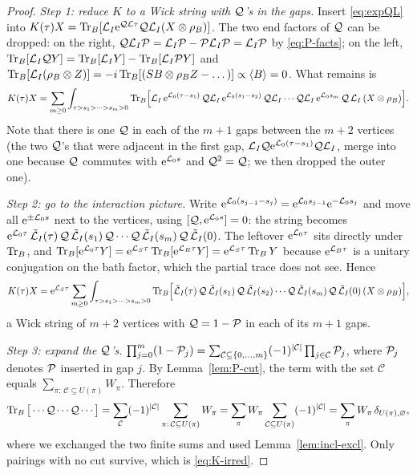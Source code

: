 \begin{proof}
\emph{Step 1: reduce $K$ to a Wick string with $\mathcal{Q}$'s in the gaps.}
Insert \cref{eq:expQL} into $K(\tau)X=\operatorname{Tr}_B[\mathcal{L}_I\mathrm{e}^{\mathcal{Q}\mathcal{L}\tau}\mathcal{Q}\mathcal{L}_I(X\otimes\rho_{B})]$.
The two end factors of $\mathcal{Q}$ can be dropped: on the right, $\mathcal{Q}\mathcal{L}_I\mathcal{P}=\mathcal{L}_I\mathcal{P}-\mathcal{P}\mathcal{L}_I\mathcal{P}=\mathcal{L}_I\mathcal{P}$ by \cref{eq:P-facts}; on the left, $\operatorname{Tr}_B[\mathcal{L}_I\mathcal{Q} Y]=\operatorname{Tr}_B[\mathcal{L}_IY]-\operatorname{Tr}_B[\mathcal{L}_I\mathcal{P} Y]$ and $\operatorname{Tr}_B[\mathcal{L}_I(\rho_{B}\otimes Z)]=-i\operatorname{Tr}_B[(SB\otimes\rho_{B} Z-\dots)]\propto\langle B\rangle=0$.
What remains is
\begin{equation}
  K(\tau)X=\sum_{m\ge0}\int_{\tau>s_1>\dots>s_m>0}\operatorname{Tr}_B\!\Big[\mathcal{L}_I\,\mathrm{e}^{\mathcal{L}_0(\tau-s_1)}\,\mathcal{Q}\mathcal{L}_I\,\mathrm{e}^{\mathcal{L}_0(s_1-s_2)}\,\mathcal{Q}\mathcal{L}_I\cdots\mathcal{Q}\mathcal{L}_I\,\mathrm{e}^{\mathcal{L}_0s_m}\,\mathcal{Q}\,\mathcal{L}_I\,(X\otimes\rho_{B})\Big].
\end{equation}
Note that there is one $\mathcal{Q}$ in each of the $m+1$ gaps between the $m+2$ vertices (the two $\mathcal{Q}$'s that were adjacent in the first gap, $\mathcal{L}_I\mathcal{Q}\mathrm{e}^{\mathcal{L}_0(\tau-s_1)}\mathcal{Q}\mathcal{L}_I$, merge into one because $\mathcal{Q}$ commutes with $\mathrm{e}^{\mathcal{L}_0 s}$ and $\mathcal{Q}^2=\mathcal{Q}$; we then dropped the outer one).

\emph{Step 2: go to the interaction picture.}
Write $\mathrm{e}^{\mathcal{L}_0(s_{j-1}-s_j)}=\mathrm{e}^{\mathcal{L}_0s_{j-1}}\mathrm{e}^{-\mathcal{L}_0s_j}$ and move all $\mathrm{e}^{\pm\mathcal{L}_0s}$ next to the vertices, using $[\mathcal{Q},\mathrm{e}^{\mathcal{L}_0s}]=0$: the string becomes $\mathrm{e}^{\mathcal{L}_0\tau}\,\tilde{\mathcal{L}}_I(\tau)\,\mathcal{Q}\,\tilde{\mathcal{L}}_I(s_1)\,\mathcal{Q}\cdots\mathcal{Q}\,\tilde{\mathcal{L}}_I(s_m)\,\mathcal{Q}\,\tilde{\mathcal{L}}_I(0)$.
The leftover $\mathrm{e}^{\mathcal{L}_0\tau}$ sits directly under $\operatorname{Tr}_B$, and $\operatorname{Tr}_B[\mathrm{e}^{\mathcal{L}_0\tau}Y]=\mathrm{e}^{\mathcal{L}_S\tau}\operatorname{Tr}_B[\mathrm{e}^{\mathcal{L}_B\tau}Y]=\mathrm{e}^{\mathcal{L}_S\tau}\operatorname{Tr}_BY$ because $\mathrm{e}^{\mathcal{L}_B\tau}$ is a unitary conjugation on the bath factor, which the partial trace does not see.
Hence
\begin{equation}
  K(\tau)X=\mathrm{e}^{\mathcal{L}_S\tau}\sum_{m\ge0}\int_{\tau>s_1>\dots>s_m>0}
  \operatorname{Tr}_B\!\Big[\tilde{\mathcal{L}}_I(\tau)\,\mathcal{Q}\,\tilde{\mathcal{L}}_I(s_1)\,\mathcal{Q}\,\tilde{\mathcal{L}}_I(s_2)\cdots\mathcal{Q}\,\tilde{\mathcal{L}}_I(s_m)\,\mathcal{Q}\,\tilde{\mathcal{L}}_I(0)\,(X\otimes\rho_{B})\Big],
  \label{eq:K-Qstring}
\end{equation}
a Wick string of $m+2$ vertices with $\mathcal{Q}=1-\mathcal{P}$ in each of its $m+1$ gaps.

\emph{Step 3: expand the $\mathcal{Q}$'s.}
$\prod_{j=0}^{m}(1-\mathcal{P}_j)=\sum_{\mathcal C\subseteq\{0,\dots,m\}}(-1)^{|\mathcal C|}\prod_{j\in\mathcal C}\mathcal{P}_j$, where $\mathcal{P}_j$ denotes $\mathcal{P}$ inserted in gap $j$.
By Lemma~\ref{lem:P-cut}, the term with the set $\mathcal C$ equals $\sum_{\pi:\,\mathcal C\subseteq U(\pi)}W_\pi$.
Therefore
\begin{equation}
  \operatorname{Tr}_B\big[\cdots\mathcal{Q}\cdots\mathcal{Q}\cdots\big]
  =\sum_{\mathcal C}(-1)^{|\mathcal C|}\sum_{\pi:\,\mathcal C\subseteq U(\pi)}W_\pi
  =\sum_{\pi}W_\pi\sum_{\mathcal C\subseteq U(\pi)}(-1)^{|\mathcal C|}
  =\sum_{\pi}W_\pi\,\delta_{U(\pi),\varnothing},
\end{equation}
where we exchanged the two finite sums and used Lemma~\ref{lem:incl-excl}.
Only pairings with no cut survive, which is \cref{eq:K-irred}.
\end{proof}

